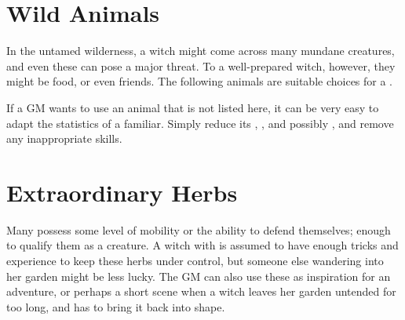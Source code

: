 \section{Wild Animals}

In the untamed wilderness, a witch might come across many mundane creatures, and even these can pose a major threat.
To a well-prepared witch, however, they might be food, or even friends.
The following animals are suitable choices for a .

If a GM wants to use an animal that is not listed here, it can be very easy to adapt the statistics of a familiar.
Simply reduce its , , and possibly , and remove any inappropriate skills.


\section{Extraordinary Herbs}

Many  possess some level of mobility or the ability to defend themselves; enough to qualify them as a creature.
A witch with  is assumed to have enough tricks and experience to keep these herbs under control, but someone else wandering into her garden might be less lucky.
The GM can also use these as inspiration for an adventure, or perhaps a short scene when a witch leaves her garden untended for too long, and has to bring it back into shape.

